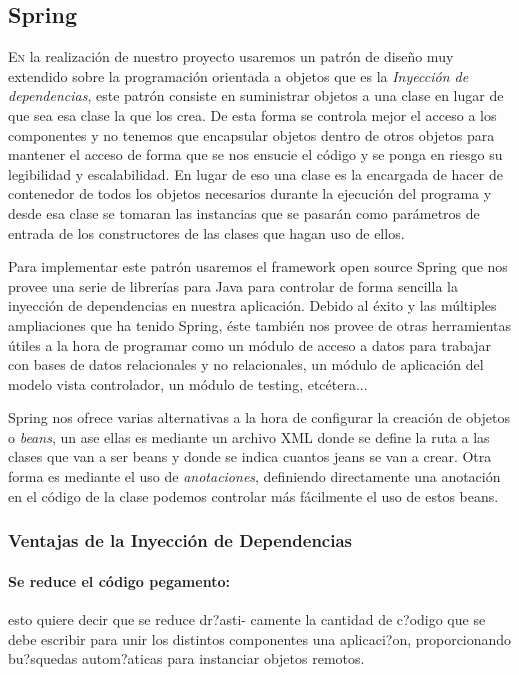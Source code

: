 \documentclass[12pt,a4paper,spanish]{book} %
\begin{document}
\subsection{Spring}
\lettrine{E}{n} la realización de nuestro proyecto usaremos un patrón de diseño muy extendido sobre la programación orientada a objetos que es la \emph{Inyección de dependencias}, este patrón consiste en suministrar objetos a una clase en lugar de que sea esa clase la que los crea. De esta forma se controla mejor el acceso a los componentes y no tenemos que encapsular objetos dentro de otros objetos para mantener el acceso de forma que se nos ensucie el código y se ponga en riesgo su legibilidad y escalabilidad. En lugar de eso una clase es la encargada de hacer de contenedor de todos los objetos necesarios durante la ejecución del programa y desde esa clase se tomaran las instancias que se pasarán como parámetros de entrada de los constructores de las clases que hagan uso de ellos.

Para implementar este patrón usaremos el framework open source Spring que nos provee una serie de librerías para Java para controlar de forma sencilla la inyección de dependencias en nuestra aplicación. Debido al éxito y las múltiples ampliaciones que ha tenido Spring, éste también nos provee de otras herramientas útiles a la hora de programar como un módulo de acceso a datos para trabajar con bases de datos relacionales y no relacionales, un módulo de aplicación del modelo vista controlador, un módulo de testing, etcétera...

Spring nos ofrece varias alternativas a la hora de configurar la creación de objetos o \emph{beans}, un ase ellas es mediante un archivo XML donde se define la ruta a las clases que van a ser beans y donde se indica cuantos jeans se van a crear. Otra forma es mediante el uso de \emph{anotaciones}, definiendo directamente una anotación en el código de la clase podemos controlar más fácilmente el uso de estos beans.

\subsubsection{Ventajas de la Inyección de Dependencias}

\paragraph{Se reduce el código pegamento: }esto quiere decir que se reduce dr?asti- camente la cantidad de c?odigo que se debe escribir para unir los distintos componentes una aplicaci?on, proporcionando bu?squedas autom?aticas para instanciar objetos remotos.
\end{document}
